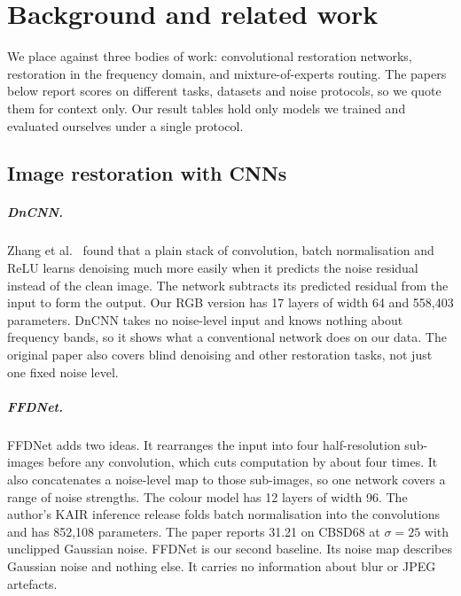 \chapter{Background and related work}\label{ch:literature}

We place \fcsg{} against three bodies of work: convolutional restoration
networks, restoration in the frequency domain, and mixture-of-experts
routing. The papers below report scores on different tasks, datasets and
noise protocols, so we quote them for context only. Our result tables hold
only models we trained and evaluated ourselves under a single protocol.

\section{Image restoration with CNNs}\label{sec:lit-cnn}

\paragraph{DnCNN.} Zhang et al.\ \cite{zhang2017dncnn} found that a plain
stack of convolution, batch normalisation and ReLU learns denoising much more
easily when it predicts the noise residual instead of the clean image. The
network subtracts its predicted residual from the input to form the output.
Our RGB version has 17 layers of width 64 and 558,403 parameters. DnCNN takes
no noise-level input and knows nothing about frequency bands, so it shows
what a conventional network does on our data. The original paper also
covers blind denoising and other restoration tasks, not just one fixed noise
level.

\paragraph{FFDNet.} FFDNet \cite{zhang2018ffdnet} adds two ideas. It
rearranges the input into four half-resolution sub-images before any
convolution, which cuts computation by about four times. It also
concatenates a noise-level map to those sub-images, so one network covers a
range of noise strengths. The colour model has 12 layers of width 96. The
author's KAIR inference release \cite{kair} folds batch normalisation into the
convolutions and has 852,108 parameters. The paper reports 31.21\dB{} on
CBSD68 at $\sigma=25$ with unclipped Gaussian noise. FFDNet is our second
baseline. Its noise map describes Gaussian noise and nothing else. It carries
no information about blur or JPEG artefacts.

